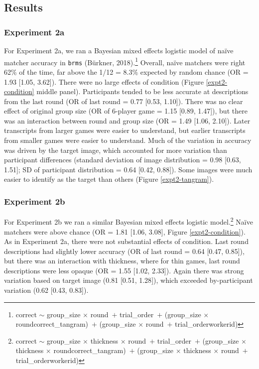 \documentclass[10pt, letterpaper]{article}
\begin{document}
\subsection{Results}\label{results}

\subsubsection{Experiment 2a}\label{experiment-2a-1}

For Experiment 2a, we ran a Bayesian mixed effects logistic model of
naïve matcher accuracy in \texttt{brms} (Bürkner, 2018).\footnote{correct
  \({\sim}\) group\_size \({\times}\) round~\({+}\) trial\_order~\({+}\)
  (group\_size \({\times}\) round\textbar correct\_tangram)~\({+}\)
  (group\_size \({\times}\) round~\({+}\) trial\_order\textbar workerid)}
Overall, naïve matchers were right 62\% of the time, far above the 1/12
= 8.3\% expected by random chance (OR = 1.93 {[}1.05, 3.62{]}). There
were no large effects of condition (Figure \ref{expt2-condition} middle
panel). Participants tended to be less accurate at descriptions from the
last round (OR of last round = 0.77 {[}0.53, 1.10{]}). There was no
clear effect of original group size (OR of 6-player game = 1.15 {[}0.89,
1.47{]}), but there was an interaction between round and group size (OR
= 1.49 {[}1.06, 2.10{]}). Later transcripts from larger games were
easier to understand, but earlier transcripts from smaller games were
easier to understand. Much of the variation in accuracy was driven by
the target image, which accounted for more variation than participant
differences (standard deviation of image distribution = 0.98 {[}0.63,
1.51{]}; SD of participant distribution = 0.64 {[}0.42, 0.88{]}). Some
images were much easier to identify as the target than others (Figure
\ref{expt2-tangram}).

\subsubsection{Experiment 2b}\label{experiment-2b-1}

For Experiment 2b we ran a similar Bayesian mixed effects logistic
model.\footnote{correct \({\sim}\) group\_size \({\times}\) thickness
  \({\times}\) round~\({+}\) trial\_order~\({+}\) (group\_size
  \({\times}\) thickness \({\times}\)
  round\textbar correct\_tangram)~\({+}\) (group\_size \({\times}\)
  thickness \({\times}\) round~\({+}\) trial\_order\textbar workerid)}
Naïve matchers were above chance (OR = 1.81 {[}1.06, 3.08{]}, Figure
\ref{expt2-condition}). As in Experiment 2a, there were not substantial
effects of condition. Last round descriptions had slightly lower
accuracy (OR of last round = 0.64 {[}0.47, 0.85{]}), but there was an
interaction with thickness, where for thin games, last round
descriptions were less opaque (OR = 1.55 {[}1.02, 2.33{]}). Again there
was strong variation based on target image (0.81 {[}0.51, 1.28{]}),
which exceeded by-participant variation (0.62 {[}0.43, 0.83{]}).
\end{document}

